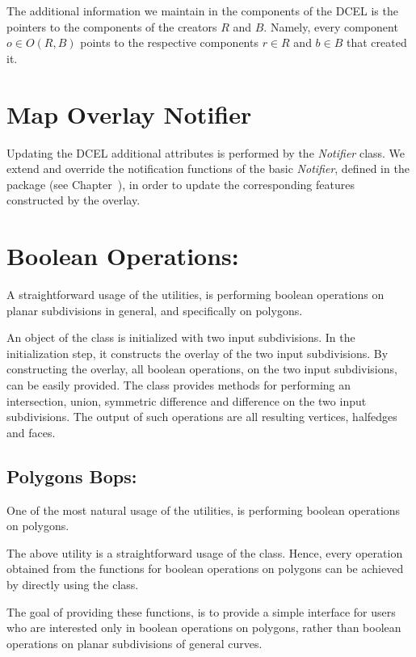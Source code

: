 \begin{ccTexOnly}
The additional information we maintain in the components of the DCEL 
is the pointers to the components of the creators $R$ and $B$.
Namely, every component $o \in O(R,B)$ points to the 
respective components $r \in R$ and $b \in B$ that created it. 


\section{Map Overlay Notifier}
\label{sec:notifier}
Updating the DCEL additional attributes is performed by the {\em Notifier} class.
We extend and override the notification functions of the basic {\em Notifier}, 
defined in the  package 
(see Chapter~), 
in order to update the corresponding features constructed by the overlay. 

\section{Boolean Operations:}
A straightforward usage of the  
utilities, is performing boolean operations on planar subdivisions in general, 
and specifically on polygons.

An object of the  class is initialized with 
two input subdivisions. In the initialization step, it constructs the overlay 
of the two input subdivisions. By constructing the overlay, all boolean operations, 
on the two input subdivisions, can be easily provided.
The   class provides methods for 
performing an intersection, union, symmetric difference and difference on the two 
input subdivisions. 
The output of such operations are all resulting vertices, halfedges and faces.


\subsection*{Polygons Bops:}
One of the most natural usage of 
the  utilities, 
is performing boolean operations on polygons.

The above utility is a straightforward usage of the 
class. Hence, every operation obtained from the functions 
for boolean operations on polygons can be achieved by 
directly using the  
class. 

The goal of providing these functions, is to 
provide a simple interface for users who are 
interested only in boolean operations on 
polygons, rather than boolean operations 
on planar subdivisions of general curves.


\end{ccTexOnly}
